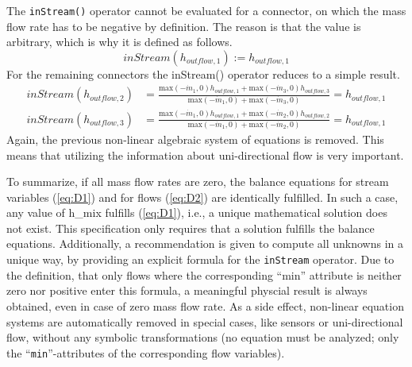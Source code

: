 The \lstinline!inStream()! operator cannot be evaluated for a connector, on which
the mass flow rate has to be negative by definition. The reason is that
the value is arbitrary, which is why it is defined as follows.
\begin{equation*}
inStream(h_{outflow,1}):=h_{outflow,1}
\end{equation*}
For the remaining connectors the inStream() operator reduces to a simple
result.
\begin{eqnarray*}
inStream(h_{outflow,2})&=\frac{\text{max}(-\dot{m}_1,0)h_{outflow,1}+\text{max}(-\dot{m}_3,0)h_{outflow,3}}{\text{max}(-\dot{m}_1,0)+\text{max}(-\dot{m}_3,0)}=h_{outflow,1}\\
inStream(h_{outflow,3})&=\frac{\text{max}(-\dot{m}_1,0)h_{outflow,1}+\text{max}(-\dot{m}_2,0)h_{outflow,2}}{\text{max}(-\dot{m}_1,0)+\text{max}(-\dot{m}_2,0)}=h_{outflow,1}
\end{eqnarray*}
Again, the previous non-linear algebraic system of equations is removed.
This means that utilizing the information about uni-directional flow is
very important.

To summarize, if all mass flow rates are zero, the balance equations for
stream variables (\ref{eq:D1}) and for flows (\ref{eq:D2}) are identically fulfilled. In
such a case, any value of h\_mix fulfills (\ref{eq:D1}), i.e., a unique
mathematical solution does not exist. This specification only requires
that a solution fulfills the balance equations. Additionally, a
recommendation is given to compute all unknowns in a unique way, by
providing an explicit formula for the \lstinline!inStream! operator. Due to the
definition, that only flows where the corresponding ``min'' attribute is
neither zero nor positive enter this formula, a meaningful physcial
result is always obtained, even in case of zero mass flow rate. As a
side effect, non-linear equation systems are automatically removed in
special cases, like sensors or uni-directional flow, without any
symbolic transformations (no equation must be analyzed; only the
``\lstinline!min!''-attributes of the corresponding flow variables).
